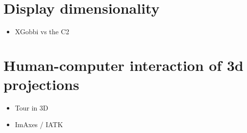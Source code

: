 \documentclass{monashthesis}
\begin{document}
\chapter{Display dimensionality}\label{ch:disp_dim}

\begin{itemize}
\tightlist
\item
  XGobbi vs the C2
\end{itemize}

\chapter{Human-computer interaction of 3d
projections}\label{ch:hci_3dproj}

\begin{itemize}
\tightlist
\item
  Tour in 3D
\item
  ImAxes / IATK
\end{itemize}

\printbibliography[heading=bibintoc]
\end{document}
